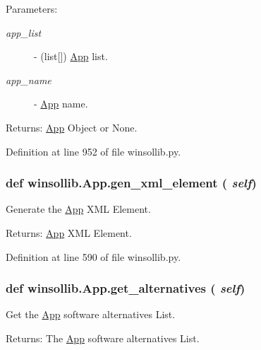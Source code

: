 \begin{Desc}
\item[Parameters:]
\begin{description}
\item[{\em app\_\-list}]- (list\mbox{[}\mbox{]}) \hyperlink{classwinsollib_1_1App}{App} list. \item[{\em app\_\-name}]- \hyperlink{classwinsollib_1_1App}{App} name. \end{description}
\end{Desc}
\begin{Desc}
\item[Returns:]\hyperlink{classwinsollib_1_1App}{App} Object or None. \end{Desc}


Definition at line 952 of file winsollib.py.\hypertarget{classwinsollib_1_1App_7b11c08aec59fb9148cffb97c26e7aa2}{
\subsubsection[gen\_\-xml\_\-element]{\setlength{\rightskip}{0pt plus 5cm}def winsollib.App.gen\_\-xml\_\-element ( {\em self})}}
\label{classwinsollib_1_1App_7b11c08aec59fb9148cffb97c26e7aa2}


Generate the \hyperlink{classwinsollib_1_1App}{App} XML Element. 

\begin{Desc}
\item[Returns:]\hyperlink{classwinsollib_1_1App}{App} XML Element. \end{Desc}


Definition at line 590 of file winsollib.py.\hypertarget{classwinsollib_1_1App_f3940b0348b589beae80ba316ba7fe2b}{
\subsubsection[get\_\-alternatives]{\setlength{\rightskip}{0pt plus 5cm}def winsollib.App.get\_\-alternatives ( {\em self})}}
\label{classwinsollib_1_1App_f3940b0348b589beae80ba316ba7fe2b}


Get the \hyperlink{classwinsollib_1_1App}{App} software alternatives List. 

\begin{Desc}
\item[Returns:]The \hyperlink{classwinsollib_1_1App}{App} software alternatives List. \end{Desc}


